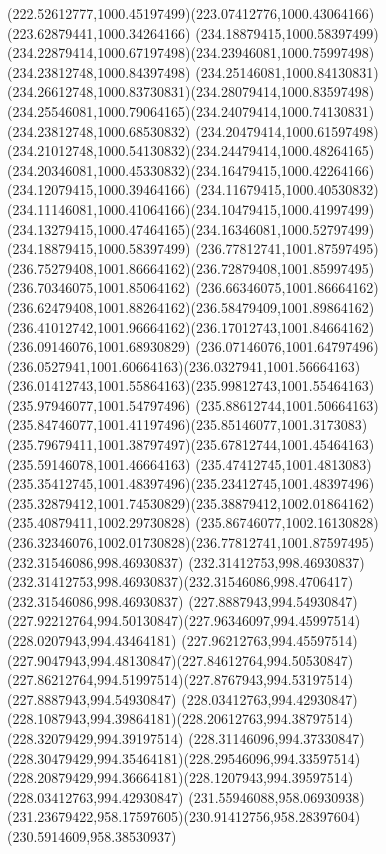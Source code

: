 {{	\curveto(222.52612777,1000.45197499)(223.07412776,1000.43064166)(223.62879441,1000.34264166)
	\moveto(234.18879415,1000.58397499)
	\curveto(234.22879414,1000.67197498)(234.23946081,1000.75997498)(234.23812748,1000.84397498)
	\curveto(234.25146081,1000.84130831)(234.26612748,1000.83730831)(234.28079414,1000.83597498)
	\curveto(234.25546081,1000.79064165)(234.24079414,1000.74130831)(234.23812748,1000.68530832)
	\curveto(234.20479414,1000.61597498)(234.21012748,1000.54130832)(234.24479414,1000.48264165)
	\curveto(234.20346081,1000.45330832)(234.16479415,1000.42264166)(234.12079415,1000.39464166)
	\curveto(234.11679415,1000.40530832)(234.11146081,1000.41064166)(234.10479415,1000.41997499)
	\curveto(234.13279415,1000.47464165)(234.16346081,1000.52797499)(234.18879415,1000.58397499)
	\moveto(236.77812741,1001.87597495)
	\curveto(236.75279408,1001.86664162)(236.72879408,1001.85997495)(236.70346075,1001.85064162)
	\curveto(236.66346075,1001.86664162)(236.62479408,1001.88264162)(236.58479409,1001.89864162)
	\curveto(236.41012742,1001.96664162)(236.17012743,1001.84664162)(236.09146076,1001.68930829)
	\curveto(236.07146076,1001.64797496)(236.0527941,1001.60664163)(236.0327941,1001.56664163)
	\curveto(236.01412743,1001.55864163)(235.99812743,1001.55464163)(235.97946077,1001.54797496)
	\curveto(235.88612744,1001.50664163)(235.84746077,1001.41197496)(235.85146077,1001.3173083)
	\curveto(235.79679411,1001.38797497)(235.67812744,1001.45464163)(235.59146078,1001.46664163)
	\curveto(235.47412745,1001.4813083)(235.35412745,1001.48397496)(235.23412745,1001.48397496)
	\curveto(235.32879412,1001.74530829)(235.38879412,1002.01864162)(235.40879411,1002.29730828)
	\curveto(235.86746077,1002.16130828)(236.32346076,1002.01730828)(236.77812741,1001.87597495)
	\moveto(232.31546086,998.46930837)
	\lineto(232.31412753,998.46930837)
	\curveto(232.31412753,998.46930837)(232.31546086,998.4706417)(232.31546086,998.46930837)
	\closepath
	\moveto(227.8887943,994.54930847)
	\curveto(227.92212764,994.50130847)(227.96346097,994.45997514)(228.0207943,994.43464181)
	\curveto(227.96212763,994.45597514)(227.9047943,994.48130847)(227.84612764,994.50530847)
	\curveto(227.86212764,994.51997514)(227.8767943,994.53197514)(227.8887943,994.54930847)
	\moveto(228.03412763,994.42930847)
	\curveto(228.1087943,994.39864181)(228.20612763,994.38797514)(228.32079429,994.39197514)
	\curveto(228.31146096,994.37330847)(228.30479429,994.35464181)(228.29546096,994.33597514)
	\curveto(228.20879429,994.36664181)(228.1207943,994.39597514)(228.03412763,994.42930847)
	\moveto(231.55946088,958.06930938)
	\curveto(231.23679422,958.17597605)(230.91412756,958.28397604)(230.5914609,958.38530937)
}}
